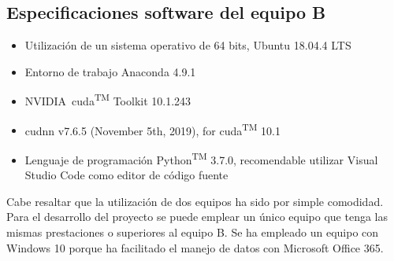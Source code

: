 \subsection{Especificaciones software del equipo B}
\label{subsec:especificaciones-software-equipob}
\begin{itemize}
    \item Utilización de un sistema operativo de 64 bits, Ubuntu 18.04.4 LTS
    \item Entorno de trabajo Anaconda 4.9.1
    \item NVIDIA\textregistered\ \gls{cuda}\textsuperscript{TM} Toolkit 10.1.243 
    \item \gls{cudnn} v7.6.5 (November 5th, 2019), for \gls{cuda}\textsuperscript{TM} 10.1
    \item Lenguaje de programación Python\textsuperscript{TM} 3.7.0, recomendable utilizar Visual Studio Code como editor de código fuente
\end{itemize}

Cabe resaltar que la utilización de dos equipos ha sido por simple comodidad. Para el desarrollo del proyecto se puede emplear un único equipo que tenga las mismas prestaciones o superiores al equipo B. Se ha empleado un equipo con Windows 10 porque ha facilitado el manejo de datos con Microsoft Office 365.
